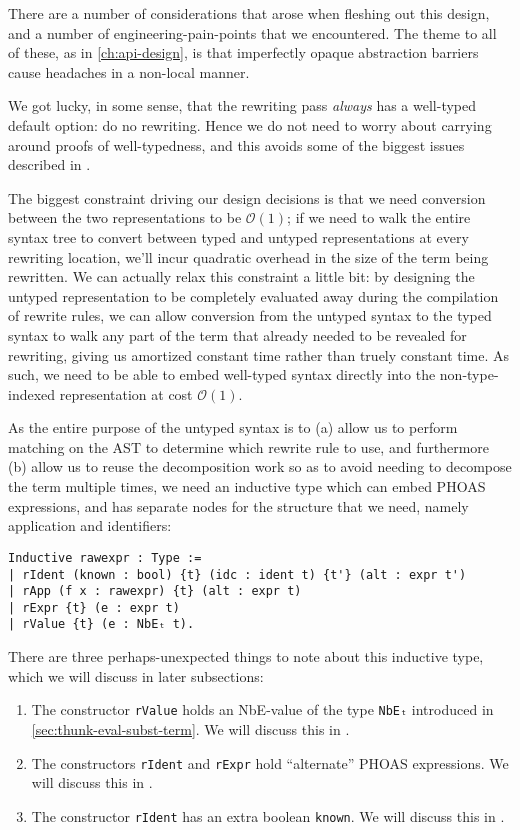 There are a number of considerations that arose when fleshing out this design, and a number of engineering-pain-points that we encountered.
The theme to all of these, as in \autoref{ch:api-design}, is that imperfectly opaque abstraction barriers cause headaches in a non-local manner.

We got lucky, in some sense, that the rewriting pass \emph{always} has a well-typed default option: do no rewriting.
Hence we do not need to worry about carrying around proofs of well-typedness, and this avoids some of the biggest issues described in .

The biggest constraint driving our design decisions is that we need conversion between the two representations to be $\mathcal{O}(1)$; if we need to walk the entire syntax tree to convert between typed and untyped representations at every rewriting location, we'll incur quadratic overhead in the size of the term being rewritten.
We can actually relax this constraint a little bit: by designing the untyped representation to be completely evaluated away during the compilation of rewrite rules, we can allow conversion from the untyped syntax to the typed syntax to walk any part of the term that already needed to be revealed for rewriting, giving us amortized constant time rather than truely constant time.
As such, we need to be able to embed well-typed syntax directly into the non-type-indexed representation at cost $\mathcal{O}(1)$.

As the entire purpose of the untyped syntax is to (a) allow us to perform matching on the AST to determine which rewrite rule to use, and furthermore (b) allow us to reuse the decomposition work so as to avoid needing to decompose the term multiple times, we need an inductive type which can embed PHOAS expressions, and has separate nodes for the structure that we need, namely application and identifiers:

\begin{verbatim}
Inductive rawexpr : Type :=
| rIdent (known : bool) {t} (idc : ident t) {t'} (alt : expr t')
| rApp (f x : rawexpr) {t} (alt : expr t)
| rExpr {t} (e : expr t)
| rValue {t} (e : NbEₜ t).
\end{verbatim}
\label{sec:rewriting-more:rawexpr-def}%
There are three perhaps-unexpected things to note about this inductive type, which we will discuss in later subsections:
\begin{enumerate}
\item
  The constructor \texttt{rValue} holds an NbE-value of the type \texttt{NbEₜ} introduced in \autoref{sec:thunk-eval-subst-term}.
  We will discuss this in .
\item
  The constructors \texttt{rIdent} and \texttt{rExpr} hold ``alternate'' PHOAS expressions.
  We will discuss this in .
\item
  The constructor \texttt{rIdent} has an extra boolean \texttt{known}.
  We will discuss this in .
\end{enumerate}

